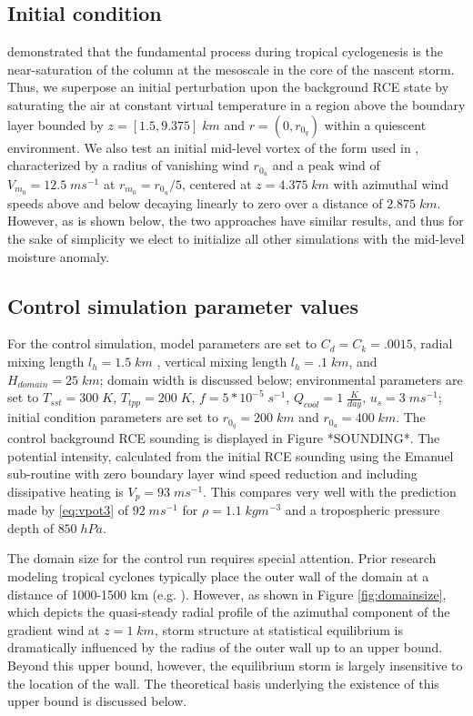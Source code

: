 \documentclass[12pt]{article}
\begin{document}
\subsection{Initial condition}
\cite{Bister_Emanuel_1997} demonstrated that the fundamental process during tropical cyclogenesis is the near-saturation of the column at the mesoscale in the core of the nascent storm. Thus, we superpose an initial perturbation upon the background RCE state by saturating the air at constant virtual temperature in a region above the boundary layer bounded by $z = [1.5, 9.375] \; km$ and $r = (0, r_{0_q})$ within a quiescent environment.  We also test an initial mid-level vortex of the form used in \cite{Rotunno_Emanuel_1987}, characterized by a radius of vanishing wind $r_{0_u}$ and a peak wind of $V_{m_0} = 12.5 \; ms^{-1}$ at $r_{m_0} = r_{0_u} / 5$, centered at $z=4.375 \; km$ with azimuthal wind speeds above and below decaying linearly to zero over a distance of $2.875 \; km$. However, as is shown below, the two approaches have similar results, and thus for the sake of simplicity we elect to initialize all other simulations with the mid-level moisture anomaly.

\subsection{Control simulation parameter values}
For the control simulation, model parameters are set to $C_d = C_k = .0015$, radial mixing length $l_h = 1.5 \; km$ \citep{Bryan_Rotunno_2009b}, vertical mixing length $l_h = .1 \; km$, and $H_{domain} = 25 \; km$; domain width is discussed below; environmental parameters are set to $T_{sst} = 300 \; K$, $T_{tpp} = 200 \; K$, $f = 5*10^{-5} \; s^{-1}$, $Q_{cool} = 1 \; \frac{K}{day}$, $u_s = 3 \; ms^{-1}$; initial condition parameters are set to $r_{0_q} = 200 \; km$ and $r_{0_u} = 400 \; km$. The control background RCE sounding is displayed in Figure *SOUNDING*. The potential intensity, calculated from the initial RCE sounding using the Emanuel sub-routine with zero boundary layer wind speed reduction and including dissipative heating is $V_p = 93 \; ms^{-1}$.  This compares very well with the prediction made by \eqref{eq:vpot3} of $92 \; ms^{-1}$ for $\rho =  1.1 \; kgm^{-3}$ and a tropospheric pressure depth of $850 \; hPa$.


The domain size for the control run requires special attention. Prior research modeling tropical cyclones typically place the outer wall of the domain at a distance of 1000-1500 km (e.g. \cite{Rotunno_Emanuel_1987, Hakim_2011}).  However, as shown in Figure \ref{fig:domainsize}, which depicts the quasi-steady radial profile of the azimuthal component of the gradient wind at $z = 1 \; km$, storm structure at statistical equilibrium is dramatically influenced by the radius of the outer wall up to an upper bound. Beyond this upper bound, however, the equilibrium storm is largely insensitive to the location of the wall. The theoretical basis underlying the existence of this upper bound is discussed below.
\end{document}
